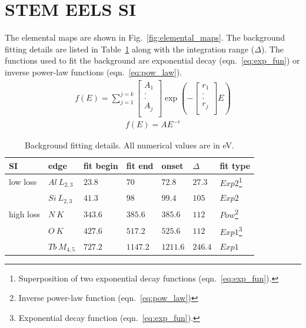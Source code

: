 \documentclass[%
 aip,
rsi,%
 amsmath,amssymb,
 reprint,%
]{revtex4-1}
\begin{document}
\section{STEM EELS SI}
\label{sec:STEMEELSSI}
The elemental maps are shown in Fig.~\ref{fig:elemental_maps}. The background fitting details are listed in Table~\ref{tab:back_fit_table} along with the integration range ($\Delta$). The functions used to fit the background are exponential decay (eqn.~\ref{eq:exp_fun}) or inverse power-law functions (eqn.~\ref{eq:pow_law}).
\begin{eqnarray}
	f(E) =
    \sum^{j=k}_{j=1}
    \left[
    \begin{array}{c}
    	A_1 	\\
        . 		\\
        . 		\\
        A_j 	\\
    \end{array}
    \right]
    \operatorname{exp}\left(-\left[
    \begin{array}{c}
    	r_1 	\\
        . 		\\
        . 		\\
        r_j 	\\
    \end{array}
    \right]E\right)
    \label{eq:exp_fun}
\end{eqnarray}
\begin{eqnarray}
	f(E) = AE^{-r}
    \label{eq:pow_law}
\end{eqnarray}
\begin{table}
	\caption{Background fitting details. All numerical values are in eV.}
    \label{tab:back_fit_table}
    \begin{ruledtabular}
    	\begin{tabular}{lllllll}
    		SI	&edge	 &fit begin&fit end&onset&$\Delta$&fit type 	\\ \hline
            low loss&$Al~L_{2,3}$& $23.8$&$70$&$72.8$&$27.3$&$Exp2$\footnote{Superposition of two exponential decay functions (eqn.~\ref{eq:exp_fun}).} 		\\
            		&$Si~L_{2,3}$&$41.3$&$98$&$99.4$&$105$&$Exp2$ 			\\ \hline
            high loss&$N~K$&$343.6$&$385.6$&$385.6$&$112$&$Pow$\footnote{Inverse power-law function (eqn.~\ref{eq:pow_law})} 			\\
                	&$O~K$&$427.6$&$517.2$&$525.6$&$112$&$Exp1$\footnote{Exponential decay function (eqn.~\ref{eq:exp_fun}).} 			\\
            		&$Tb~M_{4,5}$&$727.2$&$1147.2$&$1211.6$&$246.4$&$Exp1$ 	\\
    	\end{tabular}
    \end{ruledtabular}
\end{table}
\end{document}
